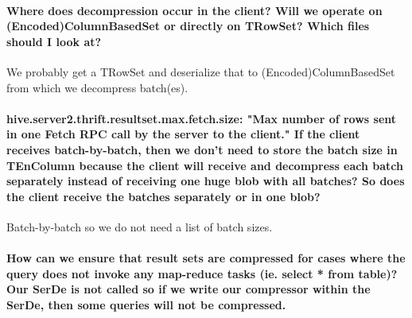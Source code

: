 \documentclass[11pt,a4paper]{article}
\begin{document}
	\paragraph{Where does decompression occur in the client? Will we operate on (Encoded)ColumnBasedSet or directly on TRowSet? Which files should I look at?}
	We probably get a TRowSet and deserialize that to (Encoded)ColumnBasedSet from which we decompress batch(es).
	
	\paragraph{hive.server2.thrift.resultset.max.fetch.size: "Max number of rows sent in one Fetch RPC call by the server to the client." If the client receives batch-by-batch, then we don't need to store the batch size in TEnColumn because the client will receive and decompress each batch separately instead of receiving one huge blob with all batches? So does the client receive the batches separately or in one blob?}
	Batch-by-batch so we do not need a list of batch sizes.
	
	\paragraph{How can we ensure that result sets are compressed for cases where the query does not invoke any map-reduce tasks (ie. select * from table)? Our SerDe is not called so if we write our compressor within the SerDe, then some queries will not be compressed.}
\end{document}
